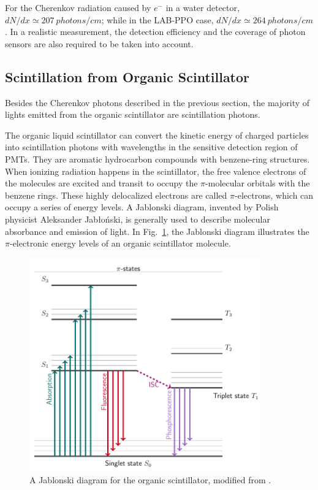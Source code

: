 For the Cherenkov radiation caused by $e^-$ in a water detector, $dN/dx \simeq 207~photons/cm$; while in the LAB-PPO case, $dN/dx \simeq 264~photons/cm$. In a realistic measurement, the detection efficiency and the coverage of photon sensors are also required to be taken into account.

\subsection{Scintillation from Organic Scintillator}

Besides the Cherenkov photons described in the previous section, the majority of lights emitted from the organic scintillator are scintillation photons.

The organic liquid scintillator can convert the kinetic energy of charged particles into scintillation photons with wavelengths in the sensitive detection region of PMTs. They are aromatic hydrocarbon compounds with benzene-ring structures. When ionizing radiation happens in the scintillator, the free valence electrons of the molecules are excited and transit to occupy the $\pi$-molecular orbitals with the benzene rings. These highly delocalized electrons are called $\pi$-electrons, which can occupy a series of energy levels. A Jablonski diagram, invented by Polish physicist Aleksander Jab\l o\'{n}ski, is generally used to describe molecular absorbance and emission of light. In Fig.~\ref{jablonski}, the Jablonski diagram illustrates the $\pi$-electronic energy levels of an organic scintillator molecule\cite{knoll2010radiation,leo2012techniques}. 
\begin{figure}[!htb]
	\centering
	\includegraphics[width=10cm]{jablonski.png}
	\caption{A Jablonski diagram for the organic scintillator, modified from \cite{birks1965theory, knoll2010radiation}.}
	\label{jablonski}
\end{figure}

